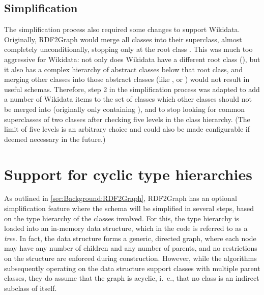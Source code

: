 \subsection{Simplification}
\label{subsec:RDF2Graph+Wikidata:Wikidata:simplification}

The simplification process also required some changes to support \gls{Wikidata}.
Originally, \gls{RDF2Graph} would merge all classes into their superclass,
almost completely unconditionally,
stopping only at the root class .
This was much too aggressive for \gls{Wikidata}:
not only does \gls{Wikidata} have a different root class (),
but it also has a complex hierarchy of abstract classes below that root class,
and merging other classes into those abstract classes
(like ,  or )
would not result in useful schemas.
Therefore, step 2 in the simplification process was adapted
to add a number of \gls{Wikidata} \glspl{item} to the set of classes which other classes should not be merged into
(originally only containing ),
and to stop looking for common superclasses of two classes after checking five levels in the class hierarchy.
(The limit of five levels is an arbitrary choice
and could also be made configurable if deemed necessary in the future.) %

\section{Support for cyclic type hierarchies}
\label{sec:RDF2Graph+Wikidata:cyclic-graphs}

As outlined in \cref{sec:Background:RDF2Graph},
\gls{RDF2Graph} has an optional simplification feature
where the \gls{schema} will be simplified in several steps,
based on the type hierarchy of the classes involved.
For this, the type hierarchy is loaded into an in-memory data structure,
which in the code is referred to as a \emph{tree}. %
In fact, the data structure forms a generic, directed graph,
where each node may have any number of children and any number of parents,
and no restrictions on the structure are enforced during construction.
However, while the algorithms subsequently operating on the data structure support classes with multiple parent classes,
they do assume that the graph is acyclic,
i.~e., that no class is an indirect subclass of itself.

